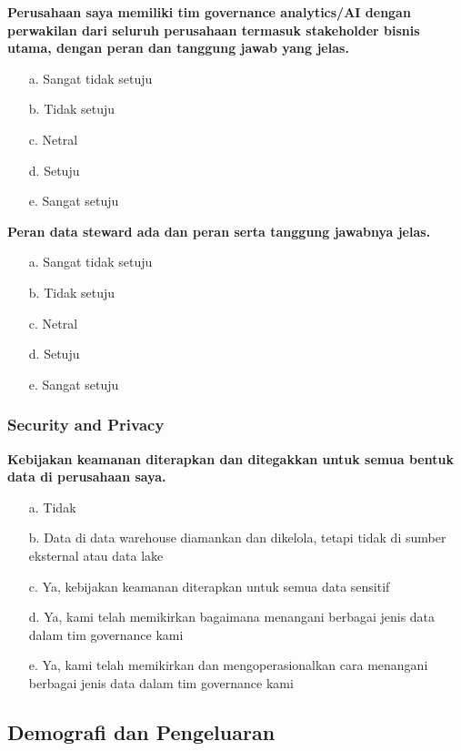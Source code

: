 \documentclass{article}
\begin{document}
\textbf{Perusahaan saya memiliki tim governance analytics/AI dengan perwakilan dari seluruh perusahaan termasuk stakeholder bisnis utama, dengan peran dan tanggung jawab yang jelas.}

\begin{enumerate}
	\item[a.] Sangat tidak setuju
	\item[b.] Tidak setuju
	\item[c.] Netral
	\item[d.] Setuju
	\item[e.] Sangat setuju
\end{enumerate}

\textbf{Peran data steward ada dan peran serta tanggung jawabnya jelas.}

\begin{enumerate}
	\item[a.] Sangat tidak setuju
	\item[b.] Tidak setuju
	\item[c.] Netral
	\item[d.] Setuju
	\item[e.] Sangat setuju
\end{enumerate}

\subsubsection{Security and Privacy}

\textbf{Kebijakan keamanan diterapkan dan ditegakkan untuk semua bentuk data di perusahaan saya.}

\begin{enumerate}
	\item[a.] Tidak
	\item[b.] Data di data warehouse diamankan dan dikelola, tetapi tidak di sumber eksternal atau data lake
	\item[c.] Ya, kebijakan keamanan diterapkan untuk semua data sensitif
	\item[d.] Ya, kami telah memikirkan bagaimana menangani berbagai jenis data dalam tim governance kami
	\item[e.] Ya, kami telah memikirkan dan mengoperasionalkan cara menangani berbagai jenis data dalam tim governance kami
\end{enumerate}

\subsection{Demografi dan Pengeluaran}
\end{document}
